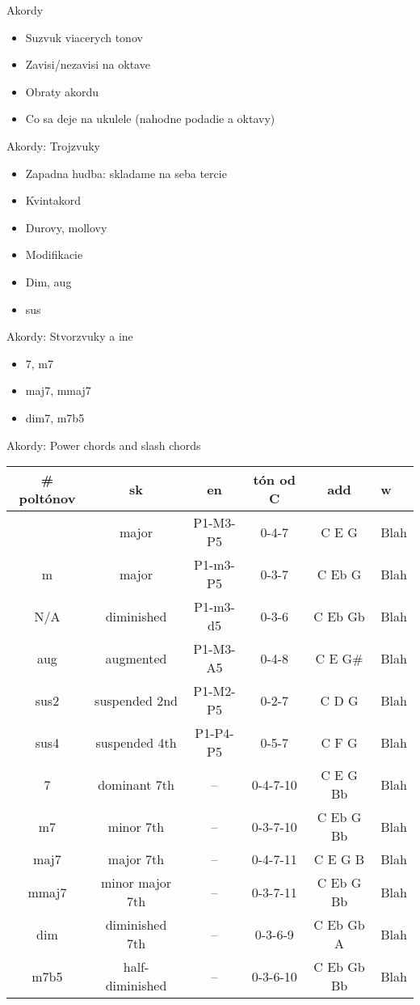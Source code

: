 Akordy

\begin{itemize}
    \item Suzvuk viacerych tonov
    \item Zavisi/nezavisi na oktave
    \item Obraty akordu
    \item Co sa deje na ukulele (nahodne podadie a oktavy)
\end{itemize}

Akordy: Trojzvuky

\begin{itemize}
    \item Zapadna hudba: skladame na seba tercie
    \item Kvintakord
    \item Durovy, mollovy
    \item Modifikacie
    \item Dim, aug
    \item sus
\end{itemize}

Akordy: Stvorzvuky a ine

\begin{itemize}
    \item 7, m7
    \item maj7, mmaj7
    \item dim7, m7b5
\end{itemize}

Akordy: Power chords and slash chords

\begin{tabularx}{\linewidth}{ c c c c c X }
    \# poltónov & sk & en & tón od C & add & w \\ 
    \hline
      & major & P1-M3-P5 & 0-4-7 & C E G & Blah \\
    m & major & P1-m3-P5 & 0-3-7 & C Eb G & Blah \\
    N/A & diminished & P1-m3-d5 & 0-3-6 & C Eb Gb & Blah \\
    aug & augmented & P1-M3-A5 & 0-4-8 & C E G\# & Blah \\
    sus2 & suspended 2nd & P1-M2-P5 & 0-2-7 & C D G & Blah \\
    sus4 & suspended 4th & P1-P4-P5 & 0-5-7 & C F G & Blah \\
    7 & dominant 7th & -- & 0-4-7-10 & C E G Bb & Blah \\
    m7 & minor 7th & -- & 0-3-7-10 & C Eb G Bb & Blah \\
    maj7 & major 7th & -- & 0-4-7-11 & C E G B & Blah \\
    mmaj7 & minor major 7th & -- & 0-3-7-11 & C Eb G Bb & Blah \\
    dim & diminished 7th & -- & 0-3-6-9 & C Eb Gb A & Blah \\
    m7b5 & half-diminished & -- & 0-3-6-10 & C Eb Gb Bb & Blah \\
\end{tabularx}

\endgroup